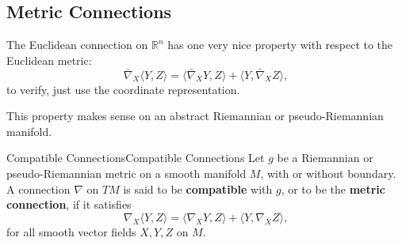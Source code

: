 \documentclass[../main.tex]{subfiles}
\begin{document}
\subsection{Metric Connections}
The Euclidean connection on $\mathbb{R}^n$ has one very nice property with respect to the Euclidean metric:
\begin{equation}
	\bar{\nabla}_X \langle Y, Z \rangle = \langle \bar{\nabla}_X Y, Z \rangle + \langle Y, \bar{\nabla}_X Z \rangle,
\end{equation}
to verify, just use the coordinate representation.

This property makes sense on an abstract Riemannian or pseudo-Riemannian manifold.
\begin{definition}{Compatible Connections}{Compatible Connections}
	Let $g$ be a Riemannian or pseudo-Riemannian metric on a smooth manifold $M$, with or without boundary. A connection $\nabla$ on $TM$ is said to be \textbf{compatible} with $g$, or to be the \textbf{metric connection}, if it satisfies
	\begin{equation}
		\nabla_X \langle Y, Z \rangle = \langle \nabla_X Y, Z \rangle + \langle Y, \nabla_X Z \rangle,
	\end{equation}
	for all smooth vector fields $X, Y, Z$ on $M$.
\end{definition}
\end{document}
